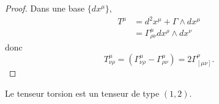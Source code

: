 \documentclass[a4paper,11pt]{report}
\begin{document}
                \begin{proof}
                    Dans une base $\{dx^\mu\}$,
                    \begin{align}
                        T^\mu &= d^2x^\mu + \Gamma\wedge dx^\mu\\
                        &= \Gamma^\mu_{\rho\nu}dx^\rho\wedge dx^\nu
                    \end{align}
                    donc
                    \begin{equation}
                        T^\mu_{\nu\rho} = \left( \Gamma^\mu_{\nu\rho}-\Gamma^\mu_{\rho\nu} \right) = 2\Gamma^\rho_{[\mu\nu]}.
                    \end{equation}
                \end{proof}
                
                \begin{prop}\begin{leftbar}
                    Le tenseur torsion est un tenseur de type $(1,2)$.
                \end{leftbar}\end{prop}
                
\end{document}
